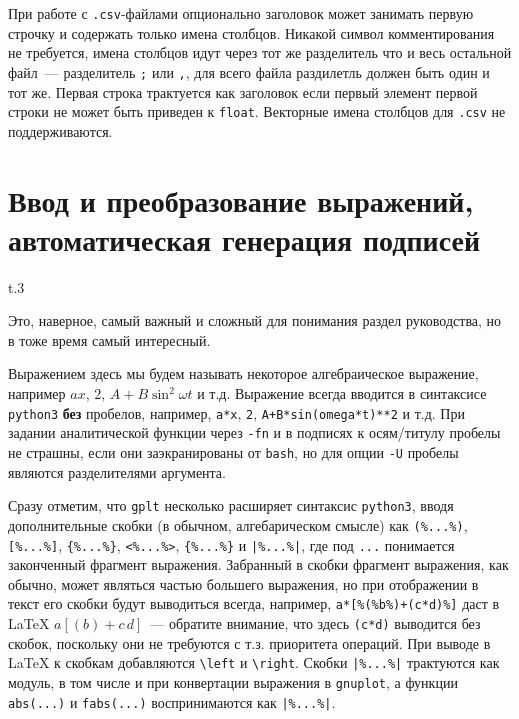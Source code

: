 \documentclass[12pt]{article}
\def\gplt{{\tt gplt}}
\def\gnuplot{{\tt gnuplot}}
\def\python{{\tt python3}}
\begin{document}
При работе с \verb'.csv'-файлами опционально заголовок может занимать первую строчку и содержать только имена столбцов. Никакой символ комментирования не требуется,
имена столбцов идут через тот же разделитель что и весь остальной файл~--- разделитель \verb';' или \verb',', для всего файла раздилетль должен быть один и тот же.
Первая строка трактуется как заголовок если первый элемент первой строки не может быть приведен к \verb'float'.
Векторные имена столбцов для \verb'.csv' не поддерживаются.

\section{Ввод и преобразование выражений, автоматическая генерация подписей}
\begin{wrapfigure}[7]{t}{.3\textwidth}
  \vphantom{.}
  \vspace{-1cm}

\end{wrapfigure}
Это, наверное, самый важный и сложный для понимания раздел руководства, но в тоже время самый интересный. 

Выражением здесь мы будем называть некоторое алгебраическое выражение, например $a x$, $2$, $A + B\sin^2\omega t$ и т.д. Выражение всегда вводится
в синтаксисе \python{} {\bf без} пробелов, например, \verb'a*x', \verb'2', \verb'A+B*sin(omega*t)**2' и т.д.
При задании аналитической функции через {\tt -fn} и в подписях к осям/титулу пробелы не страшны, если они
  заэкранированы от {\tt bash}, но для опции {\tt -U} пробелы являются разделителями аргумента. 

  Сразу отметим, что \gplt{} несколько расширяет синтаксис \python{}, вводя дополнительные скобки (в обычном, алгебарическом смысле) как
\verb'(%...%)', \verb'[%...%]', \verb'{%...%}', \verb'<%...%>', \verb'{%...%}' и \verb'|%...%|', где под \verb'...' понимается законченный фрагмент выражения.
Забранный в скобки фрагмент выражения, как обычно, может являться частью большего выражения, но при отображении в текст его скобки будут выводиться всегда, например,
\verb'a*[%(%b%)+(c*d)%]' даст в \LaTeX{}
$a[(b)+c\,d]$~--- обратите внимание, что здесь \verb'(c*d)' выводится без скобок, поскольку они не требуются
с т.з. приоритета операций. При выводе в \LaTeX{} к скобкам добавляются \verb'\left' и \verb'\right'. Скобки \verb'|%...%|' трактуются как модуль,
в том числе и при конвертации выражения в \gnuplot{}, а функции \verb'abs(...)' и \verb'fabs(...)' воспринимаются как \verb'|%...%|'.
\end{document}
